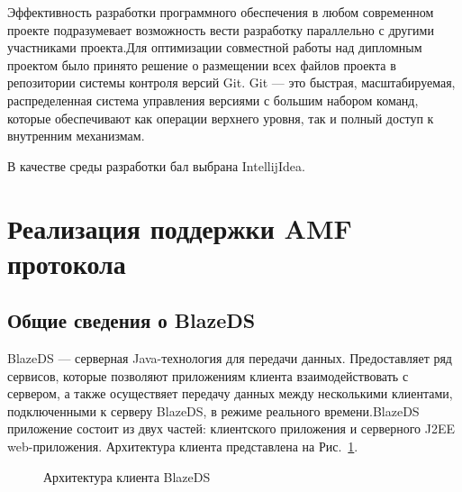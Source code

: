 Эффективность разработки программного обеспечения в любом современном проекте подразумевает возможность вести
разработку параллельно с другими участниками проекта.Для оптимизации совместной работы над дипломным проектом было
принято решение о размещении всех файлов проекта в репозитории системы контроля версий Git. Git --- это быстрая,
масштабируемая, распределенная система управления версиями с большим набором команд, которые обеспечивают как
операции верхнего уровня, так и полный доступ к внутренним механизмам.

В качестве среды разработки бал выбрана IntellijIdea\cite{idea-book}.

\section{Реализация поддержки AMF протокола}

\subsection{Общие сведения о BlazeDS}
BlazeDS --- серверная Java-технология для передачи данных. Предоставляет ряд сервисов, которые позволяют приложениям
клиента взаимодействовать с сервером, а также осуществяет передачу данных между несколькими клиентами, подключенными 
к серверу BlazeDS, в режиме реального времени.BlazeDS приложение состоит из двух частей: клиентского приложения и серверного 
J2EE web-приложения. Архитектура клиента представлена на Рис.~\ref{ris:blazeDSClient.png}.

\begin{figure}[ht]
\caption{Архитектура клиента BlazeDS}
\label{ris:blazeDSClient.png}
\end{figure}

